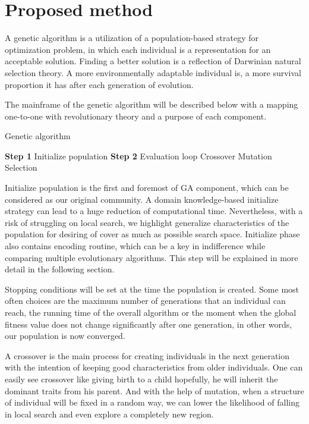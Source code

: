 \section{Proposed method}
A genetic algorithm is a utilization of a population-based strategy for optimization problem, in which each individual is a representation for an acceptable solution. Finding a better solution is a reflection of Darwinian natural selection theory. A more environmentally adaptable individual is, a more survival proportion it has after each generation of evolution.

The mainframe of the genetic algorithm will be described below with a mapping one-to-one with revolutionary theory and a purpose of each component.

\begin{algorithm}
\caption{Genetic algorithm}
\begin{algorithmic}[0]
\State \textbf{Step 1} Initialize population
\State \textbf{Step 2} Evaluation loop
		\State Crossover
		\State Mutation
		\State Selection
	\EndWhile
\end{algorithmic}
\end{algorithm}

Initialize population is the first and foremost of GA component, which can be considered as our original community. A domain knowledge-based initialize strategy can lead to a huge reduction of computational time. Nevertheless, with a risk of struggling on local search, we highlight generalize characteristics of the population for desiring of cover as much as possible search space. Initialize phase also contains encoding routine, which can be a key in indifference while comparing multiple evolutionary algorithms. This step will be explained in more detail in the following section.

Stopping conditions will be set at the time the population is created. Some most often choices are the maximum number of generations that an individual can reach, the running time of the overall algorithm or the moment when the global fitness value does not change significantly after one generation, in other words, our population is now converged.

A crossover is the main process for creating individuals in the next generation with the intention of keeping good characteristics from older individuals. One can easily see crossover like giving birth to a child hopefully, he will inherit the dominant traits from his parent. And with the help of mutation, when a structure of individual will be fixed in a random way, we can lower the likelihood of falling in local search and even explore a completely new region.

